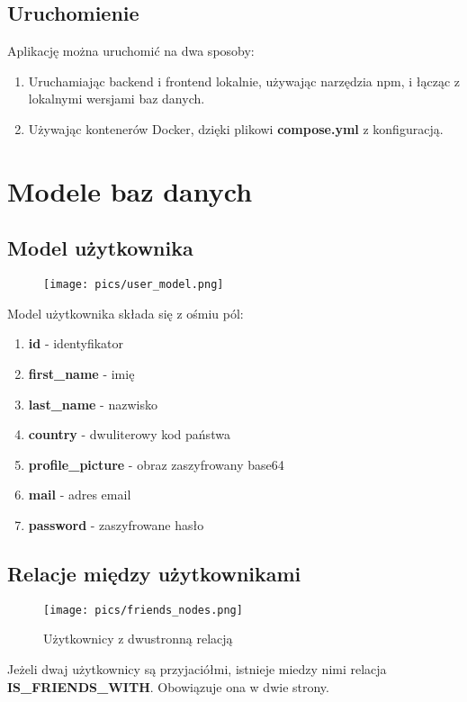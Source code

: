 \documentclass{article}
\begin{document}
\subsection{Uruchomienie}
Aplikację można uruchomić na dwa sposoby:
\begin{enumerate}
    \item Uruchamiając backend i frontend lokalnie, używając narzędzia npm, i łącząc z lokalnymi wersjami baz danych.
    \item Używając kontenerów Docker, dzięki plikowi \textbf{compose.yml} z konfiguracją.
\end{enumerate}

\newpage
\section{Modele baz danych}
\subsection{Model użytkownika}
\begin{figure}[h]
    \centering
    \texttt{[image: pics/user\_model.png]}
\end{figure}

Model użytkownika składa się z ośmiu pól: \nolinebreak
\begin{enumerate}[itemsep=0mm]
  \item \textbf{id} - identyfikator
  \item \textbf{first\_name} - imię
  \item \textbf{last\_name} - nazwisko
  \item \textbf{country} - dwuliterowy kod państwa
  \item \textbf{profile\_picture} - obraz zaszyfrowany base64
  \item \textbf{mail} - adres email
  \item \textbf{password} - zaszyfrowane hasło
\end{enumerate}

\newpage
\subsection{Relacje między użytkownikami}
\begin{figure}[h]
    \centering
    \texttt{[image: pics/friends\_nodes.png]}
    \caption*{Użytkownicy z dwustronną relacją}
\end{figure}

Jeżeli dwaj użytkownicy są przyjaciółmi, istnieje miedzy nimi relacja \\
\textbf{IS\_FRIENDS\_WITH}. Obowiązuje ona w dwie strony.
\end{document}
